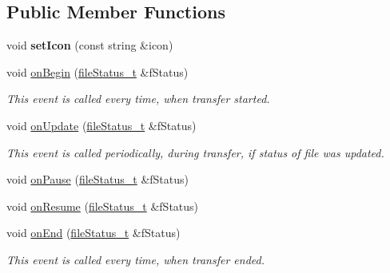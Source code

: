 \subsection*{\-Public \-Member \-Functions}
\begin{DoxyCompactItemize}
\item 
\hypertarget{classnotifyProgressHandler_a1b6002f8585d5a03c6d78b574d9e9740}{void {\bfseries set\-Icon} (const string \&icon)}\label{classnotifyProgressHandler_a1b6002f8585d5a03c6d78b574d9e9740}

\item 
void \hyperlink{classnotifyProgressHandler_a14f1dd6907fbbcf73497add401444b81}{on\-Begin} (\hyperlink{classfileStatus__t}{file\-Status\-\_\-t} \&f\-Status)
\begin{DoxyCompactList}\small\item\em \-This event is called every time, when transfer started. \end{DoxyCompactList}\item 
void \hyperlink{classnotifyProgressHandler_a381e5bb0f988042b8a913d72b6ed9f25}{on\-Update} (\hyperlink{classfileStatus__t}{file\-Status\-\_\-t} \&f\-Status)
\begin{DoxyCompactList}\small\item\em \-This event is called periodically, during transfer, if status of file was updated. \end{DoxyCompactList}\item 
void \hyperlink{classnotifyProgressHandler_a9c5101d80a1fffdafb4f5da926864280}{on\-Pause} (\hyperlink{classfileStatus__t}{file\-Status\-\_\-t} \&f\-Status)
\item 
void \hyperlink{classnotifyProgressHandler_a1c96f580551550f65bc4788656b02d7f}{on\-Resume} (\hyperlink{classfileStatus__t}{file\-Status\-\_\-t} \&f\-Status)
\item 
void \hyperlink{classnotifyProgressHandler_a3d3cb95504ba9352a84fa1345404e88f}{on\-End} (\hyperlink{classfileStatus__t}{file\-Status\-\_\-t} \&f\-Status)
\begin{DoxyCompactList}\small\item\em \-This event is called every time, when transfer ended. \end{DoxyCompactList}\end{DoxyCompactItemize}


